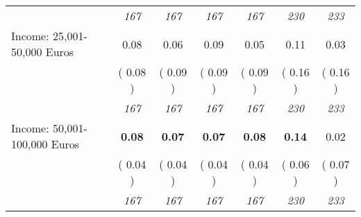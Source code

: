 \begin{tabular}{l c c c c c c}
& \textit{ 167 } & \textit{ 167 } & \textit{ 167 } & \textit{ 167 } & \textit{ 230 } & \textit{ 233 } \\
Income: 25,001-50,000 Euros &      0.08 &      0.06 &      0.09 &      0.05 &      0.11 &      0.03 \\
& (     0.08 ) & (     0.09 ) & (     0.09 ) & (     0.09 ) & (     0.16 ) & (     0.16 ) \\
& \textit{ 167 } & \textit{ 167 } & \textit{ 167 } & \textit{ 167 } & \textit{ 230 } & \textit{ 233 } \\
Income: 50,001-100,000 Euros & \textbf{      0.08 } & \textbf{      0.07 } & \textbf{      0.07 } & \textbf{     0.08} & \textbf{      0.14 } &      0.02 \\
& (     0.04 ) & (     0.04 ) & (     0.04 ) & (     0.04 ) & (     0.06 ) & (     0.07 ) \\
& \textit{ 167 } & \textit{ 167 } & \textit{ 167 } & \textit{ 167 } & \textit{ 230 } & \textit{ 233 } \\
\bottomrule
\end{tabular}
